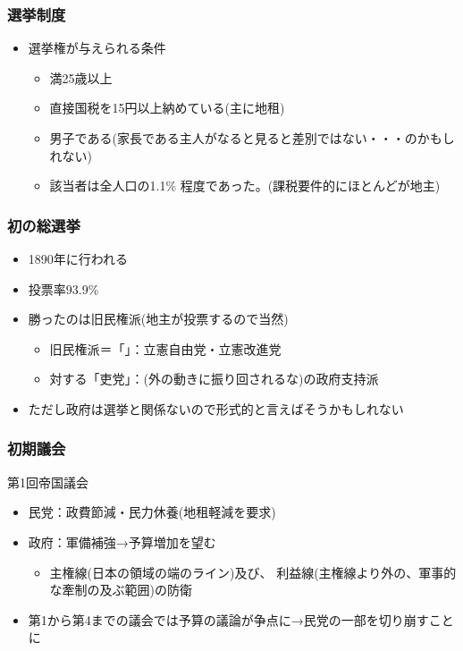 \documentclass[12pt,fleqn]{ltjsarticle}
\begin{document}
\subsubsection{選挙制度}
\begin{itemize}
\item 選挙権が与えられる条件
\begin{itemize}
\item 満25歳以上
\item 直接国税を15円以上納めている(主に地租)
\item 男子である(家長である主人がなると見ると差別ではない・・・のかもしれない)

\item 該当者は全人口の1.1\% 程度であった。(課税要件的にほとんどが地主)
\end{itemize}

\end{itemize}

\subsubsection{初の総選挙}
\begin{itemize}
\item 1890年に行われる
\item 投票率93.9\%
\item 勝ったのは旧民権派(地主が投票するので当然)
\begin{itemize}
\item 旧民権派＝「」：立憲自由党・立憲改進党
\item 対する「吏党」：(外の動きに振り回されるな)の政府支持派
\end{itemize}
\item ただし政府は選挙と関係ないので形式的と言えばそうかもしれない
\end{itemize}

\subsubsection{初期議会}
 第1回帝国議会
\begin{itemize}
\item 民党：政費節減・民力休養(地租軽減を要求)
\item 政府：軍備補強→予算増加を望む
\begin{itemize}
\item 主権線(日本の領域の端のライン)及び、
利益線(主権線より外の、軍事的な牽制の及ぶ範囲)の防衛
\end{itemize}
\item 第1から第4までの議会では予算の議論が争点に→民党の一部を切り崩すことに
\end{itemize}
\end{document}
